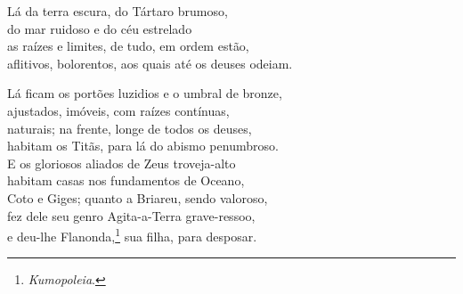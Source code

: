 \quad{}Lá da terra escura, do Tártaro brumoso,\\
do mar ruidoso e do céu estrelado\\
as raízes e limites, de tudo, em ordem estão,\\
aflitivos, bolorentos, aos quais até os deuses odeiam. 

\quad{}Lá ficam os portões luzidios e o umbral de bronze,\\
ajustados, imóveis, com raízes contínuas,\\
naturais; na frente, longe de todos os deuses,\\
habitam os Titãs, para lá do abismo penumbroso.\\
E os gloriosos aliados de Zeus troveja-alto \\
habitam casas nos fundamentos de Oceano,\\
Coto e Giges; quanto a Briareu, sendo valoroso,\\
fez dele seu genro Agita-a-Terra grave-ressoo,\\
e deu-lhe Flanonda,\footnote{\emph{Kumopoleia}.} sua filha, para desposar.


